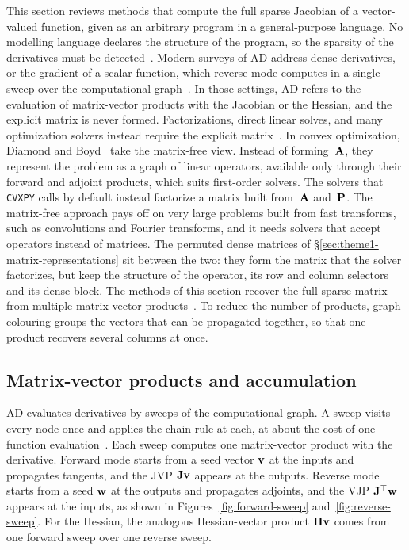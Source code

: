 This section reviews methods that compute the full sparse Jacobian of a vector-valued
function, given as an arbitrary program in a general-purpose language. No modelling language
declares the structure of the program, so the sparsity of the derivatives must be
detected~\cite{hill2025sparser}. Modern surveys of AD address dense derivatives, or the
gradient of a scalar function, which reverse mode computes in a single sweep over the
computational graph~\cite{baydin2017ADsurvey, blondel2024elements}. In those
settings, AD refers to the evaluation of matrix-vector products with the Jacobian or the
Hessian, and the explicit matrix is never formed. Factorizations, direct linear solves, and
many optimization solvers instead require the explicit matrix~\cite{hill2025sparser}.
In convex optimization, Diamond and Boyd~\cite{diamond2016matrixfree} take the matrix-free
view. Instead of forming~$\mathbf{A}$, they represent the problem
as a graph of linear operators, available only through their forward and adjoint products,
which suits first-order solvers. The solvers that \texttt{CVXPY} calls by default instead
factorize a matrix built from~$\mathbf{A}$ and~$\mathbf{P}$. The matrix-free approach pays off on
very large problems built from fast transforms, such as convolutions and Fourier transforms,
and it needs solvers that accept operators instead of matrices. The permuted dense matrices of
\S\ref{sec:theme1-matrix-representations} sit between the two: they form the matrix that the
solver factorizes, but keep the structure of the operator, its row and column selectors and
its dense block.
The methods of this section recover the full sparse matrix from multiple matrix-vector
products~\cite{griewank2008evaluating}. To reduce the number of products, graph colouring
groups the vectors that can be
propagated together, so that one product recovers several columns at once.

\subsection{Matrix-vector products and accumulation}\label{sec:matrix-free-diff}
AD evaluates derivatives by sweeps of the computational graph. A sweep visits every node
once and applies the chain rule at each, at about the cost of one function
evaluation~\cite{griewank2008evaluating}. Each sweep computes one matrix-vector product
with the derivative. Forward mode starts from a seed vector $\mathbf{v}$ at
the inputs and propagates tangents, and the \ac{JVP} $\mathbf{J}\mathbf{v}$ appears at the outputs.
Reverse mode starts from a seed $\mathbf{w}$ at the outputs and propagates adjoints, and the
\ac{VJP} $\mathbf{J}^\top \mathbf{w}$ appears at the inputs, as shown in
Figures~\ref{fig:forward-sweep} and~\ref{fig:reverse-sweep}. For the Hessian, the analogous
Hessian-vector product $\mathbf{H}\mathbf{v}$ comes from one forward sweep over one reverse sweep.


